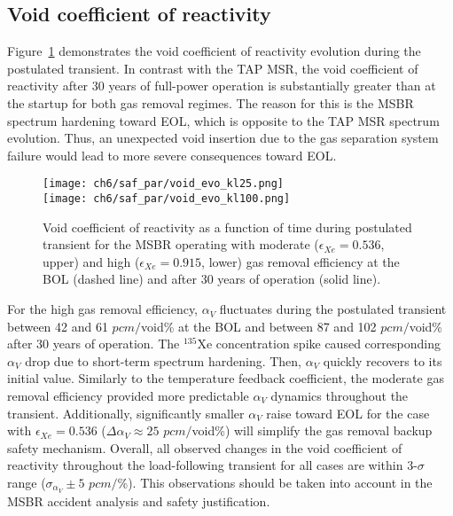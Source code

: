 \subsection{Void coefficient of reactivity}
Figure~\ref{fig:msbr-lf-void-evo} demonstrates the void coefficient of 
reactivity evolution during the postulated transient. 
In contrast with the \gls{TAP} \gls{MSR}, the void coefficient of reactivity 
after 30 years of full-power operation is substantially greater than at the 
startup for both gas removal regimes. The reason for this is the \gls{MSBR} 
spectrum hardening toward \gls{EOL}, which is opposite to the \gls{TAP} 
\gls{MSR} spectrum evolution. Thus, an unexpected void insertion due to the 
gas separation system failure would lead to more severe consequences toward 
\gls{EOL}. 
\begin{figure}[htbp!] %
	\centering
	\texttt{[image: ch6/saf\_par/void\_evo\_kl25.png]}\\
	\vspace{-12mm}
	\hspace{+0.05mm}
	\texttt{[image: ch6/saf\_par/void\_evo\_kl100.png]}
	\vspace{-3mm}
	\caption{Void coefficient of reactivity as a function of time during 
	postulated transient
for the \gls{MSBR} operating with moderate 
	($\epsilon_{Xe}=0.536$, upper) and high ($\epsilon_{Xe}=0.915$, lower) gas 
	removal efficiency at the \gls{BOL} (dashed line) and after 30 years of 
	operation (solid line).}
	\label{fig:msbr-lf-void-evo}
\end{figure}

For the high gas removal efficiency, $\alpha_V$ fluctuates during the 
postulated transient between 42 and 61 $pcm/$void\% at the \gls{BOL} and 
between 87 and 102 $pcm/$void\% after 30 years of operation. The $^{135}$Xe 
concentration spike caused corresponding $\alpha_V$ drop due to short-term 
spectrum hardening. Then, $\alpha_V$ quickly recovers to its initial value. 
Similarly to the temperature feedback coefficient, the moderate gas removal 
efficiency provided more predictable $\alpha_V$ dynamics throughout the 
transient. Additionally, significantly smaller $\alpha_V$ raise toward 
\gls{EOL} for the case with $\epsilon_{Xe}=0.536$ ($\Delta\alpha_V\approx25$ 
$pcm/$void\%) will simplify the gas removal backup safety mechanism. 
Overall, all observed changes in the void coefficient of reactivity throughout 
the load-following transient for all cases are within 3-$\sigma$ range 
($\sigma_{\alpha_V}\pm5$ $pcm/$\%). This observations should be taken 
into account in the \gls{MSBR} accident analysis and safety
justification.

